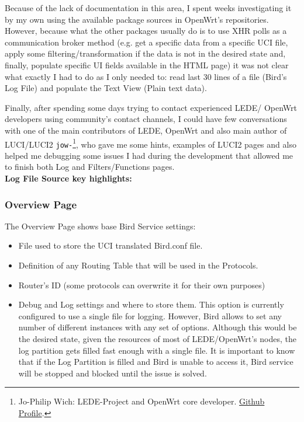 Because of the lack of documentation in this area, I spent weeks investigating it by my own using the available package sources in OpenWrt's repositories. However, because what the other packages usually do is to use XHR polls as a communication broker method (e.g. get a specific data from a specific UCI file, apply some filtering/transformation if the data is not in the desired state and, finally, populate specific UI fields available in the HTML page) it was not clear what exactly I had to do as I only needed to: read last 30 lines of a file (Bird's Log File) and populate the Text View (Plain text data).

Finally, after spending some days trying to contact experienced LEDE/ OpenWrt developers using community's contact channels, I could have few conversations with one of the main contributors of LEDE, OpenWrt and also main author of LUCI/LUCI2 \texttt{jow-}\footnote{Jo-Philip Wich: LEDE-Project and OpenWrt core developer. \href{https://github.com/jow-}{Github Profile}.}, who gave me some hints, examples of LUCI2 pages and also helped me debugging some issues I had during the development that allowed me to finish both Log and Filters/Functions pages.\\

\textbf{Log File Source key highlights:}



\subsubsection{Overview Page}
The Overview Page shows base Bird Service settings:

\begin{itemize}
    \item File used to store the UCI translated Bird.conf file.
    \item Definition of any Routing Table that will be used in the Protocols.
    \item Router's ID (some protocols can overwrite it for their own purposes)
    \item Debug and Log settings and where to store them.
    This option is currently configured to use a single file for logging. However, Bird allows to set any number of different instances with any set of options. Although this would be the desired state, given the resources of most of LEDE/OpenWrt's nodes, the log partition gets filled fast enough with a single file. It is important to know that if the Log Partition is filled and Bird is unable to access it, Bird service will be stopped and blocked until the issue is solved.
\end{itemize}

